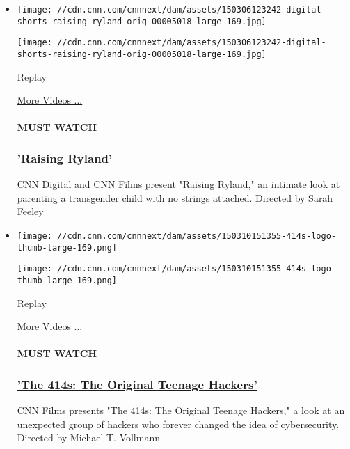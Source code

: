 \begin{itemize}
\item
  \texttt{[image: //cdn.cnn.com/cnnnext/dam/assets/150306123242-digital-shorts-raising-ryland-orig-00005018-large-169.jpg]}

  \texttt{[image: //cdn.cnn.com/cnnnext/dam/assets/150306123242-digital-shorts-raising-ryland-orig-00005018-large-169.jpg]}\href{javascript:void(0);}{}

  Replay

  \href{/videos}{More Videos ...}

  \hypertarget{must-watch-2}{%
  \paragraph{MUST WATCH}\label{must-watch-2}}

  \hypertarget{raising-ryland}{%
  \subsubsection{\texorpdfstring{\href{/videos/living/2015/03/06/digital-shorts-raising-ryland-orig.cnn}{'Raising
  Ryland'}}{'Raising Ryland'}}\label{raising-ryland}}

  CNN Digital and CNN Films present "Raising Ryland," an intimate look
  at parenting a transgender child with no strings attached. Directed by
  Sarah Feeley
\end{itemize}

\begin{itemize}
\item
  \texttt{[image: //cdn.cnn.com/cnnnext/dam/assets/150310151355-414s-logo-thumb-large-169.png]}

  \texttt{[image: //cdn.cnn.com/cnnnext/dam/assets/150310151355-414s-logo-thumb-large-169.png]}\href{javascript:void(0);}{}

  Replay

  \href{/videos}{More Videos ...}

  \hypertarget{must-watch-3}{%
  \paragraph{MUST WATCH}\label{must-watch-3}}

  \hypertarget{the-414s-the-original-teenage-hackers}{%
  \subsubsection{\texorpdfstring{\href{/videos/tech/2015/03/10/digital-shorts-original-teenage-hackers-orig.cnn}{'The
  414s: The Original Teenage
  Hackers'}}{'The 414s: The Original Teenage Hackers'}}\label{the-414s-the-original-teenage-hackers}}

  CNN Films presents "The 414s: The Original Teenage Hackers," a look at
  an unexpected group of hackers who forever changed the idea of
  cybersecurity. Directed by Michael T. Vollmann
\end{itemize}

